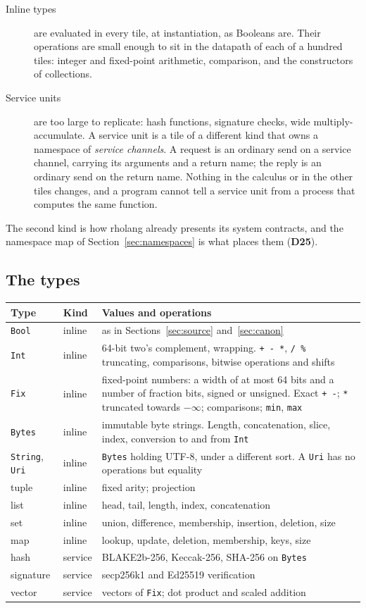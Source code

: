 \documentclass[10.5pt,a4paper]{extarticle}
\newcommand{\kw}[1]{\texttt{#1}}
\newcommand{\dec}[1]{\textbf{D#1}}
\theoremstyle{definition}
\theoremstyle{remark}
\begin{document}
\begin{description}
\item[Inline types] are evaluated in every tile, at instantiation, as
Booleans are. Their operations are small enough to sit in the datapath of
each of a hundred tiles: integer and fixed-point arithmetic, comparison, and
the constructors of collections.
\item[Service units] are too large to replicate: hash functions, signature
checks, wide multiply-accumulate. A service unit is a tile of a different
kind that owns a namespace of \emph{service channels}. A request is an
ordinary send on a service channel, carrying its arguments and a return
name; the reply is an ordinary send on the return name. Nothing in the
calculus or in the other tiles changes, and a program cannot tell a service
unit from a process that computes the same function.
\end{description}
The second kind is how rholang already presents its system contracts, and the
namespace map of Section~\ref{sec:namespaces} is what places them (\dec{25}).

\subsection{The types}\label{sec:types}

\noindent
\begin{tabularx}{\textwidth}{@{}l l X@{}}
\toprule
Type & Kind & Values and operations\\
\midrule
\kw{Bool} & inline & as in Sections~\ref{sec:source} and~\ref{sec:canon}\\
\kw{Int} & inline & 64-bit two's complement, wrapping. \kw{+ - *},
  \kw{/ \%} truncating, comparisons, bitwise operations and shifts\\
\kw{Fix} & inline & fixed-point numbers: a width of at most 64 bits and a
  number of fraction bits, signed or unsigned. Exact \kw{+ -}; \kw{*}
  truncated towards $-\infty$; comparisons; \kw{min}, \kw{max}\\
\kw{Bytes} & inline & immutable byte strings. Length, concatenation, slice,
  index, conversion to and from \kw{Int}\\
\kw{String}, \kw{Uri} & inline & \kw{Bytes} holding UTF-8, under a
  different sort. A \kw{Uri} has no operations but equality\\
tuple & inline & fixed arity; projection\\
list & inline & head, tail, length, index, concatenation\\
set & inline & union, difference, membership, insertion, deletion, size\\
map & inline & lookup, update, deletion, membership, keys, size\\
\midrule
hash & service & BLAKE2b-256, Keccak-256, SHA-256 on \kw{Bytes}\\
signature & service & secp256k1 and Ed25519 verification\\
vector & service & vectors of \kw{Fix}; dot product and scaled addition\\
\bottomrule
\end{tabularx}
\end{document}
